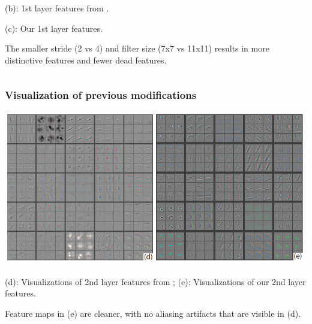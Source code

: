 \begin{frame}
\begin{columns}
\begin{column}{.4\textwidth}
		(b): 1st layer features from \cite{krizhevsky2012imagenet}. 
		
		\medskip 
		
		(c): Our 1st layer features. 
		
		\pause 
		
		\bigskip 
		
		The smaller stride (2 vs 4) and filter size (7x7 vs 11x11) results in more distinctive features and fewer dead features. 
		\end{column}%
	\end{columns}
	
	
	
	

	

		
\end{frame}

\begin{frame}
	\frametitle{Visualization of previous modifications}
	
	\begin{center}
		\includegraphics[scale=0.8]{figs/ZFNet_modif_2layer}
	\end{center}
	
	(d): Visualizations of 2nd layer features from \cite{krizhevsky2012imagenet};  (e): Visualizations of our 2nd layer features. 
	
	\pause 
	
	Feature maps in (e) are cleaner, with no aliasing artifacts that are visible in (d).
	
\end{frame}




